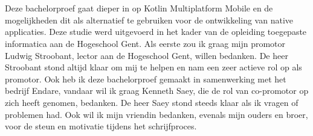 
\chapter*{}
\label{ch:voorwoord}


Deze bachelorproef gaat dieper in op Kotlin Multiplatform Mobile en de mogelijkheden dit als alternatief te gebruiken voor de ontwikkeling van native applicaties. Deze studie werd uitgevoerd in het kader van de opleiding toegepaste informatica aan de Hogeschool Gent. Als eerste zou ik graag mijn promotor Ludwig Stroobant, lector aan de Hogeschool Gent, willen bedanken. De heer Stroobant stond altijd klaar om mij te helpen en nam een zeer actieve rol op als promotor. Ook heb ik deze bachelorproef gemaakt in samenwerking met het bedrijf Endare, vandaar wil ik graag Kenneth Saey, die de rol van co-promotor op zich heeft genomen, bedanken. De heer Saey stond steeds klaar als ik vragen of problemen had. Ook wil ik mijn vriendin bedanken, evenals mijn ouders en broer, voor de steun en motivatie tijdens het schrijfproces.